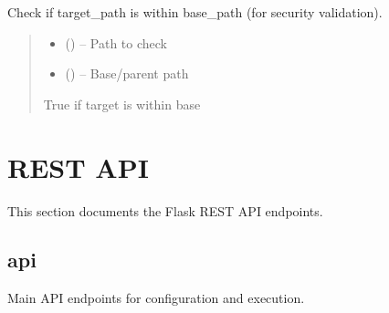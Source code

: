 \documentclass[a4paper,11pt,english,openany,oneside]{sphinxmanual}
\begin{document}
\begin{fulllineitems}
\label{\detokenize{modules/core:core.path_utils.is_path_within}}
\pysigstartsignatures
\pysiglinewithargsret
{}
{\sphinxparamcomma {}}
{}
\pysigstopsignatures
\sphinxAtStartPar
Check if target\_path is within base\_path (for security validation).
\begin{quote}\begin{description}
\begin{itemize}
\item {} 
\sphinxAtStartPar
{} () – Path to check

\item {} 
\sphinxAtStartPar
{} () – Base/parent path

\end{itemize}

\sphinxAtStartPar
True if target is within base

\sphinxAtStartPar
{}

\end{description}\end{quote}

\end{fulllineitems}


\sphinxstepscope


\chapter{REST API}
\label{\detokenize{modules/api:rest-api-reference}}\label{\detokenize{modules/api::doc}}
\sphinxAtStartPar
This section documents the Flask REST API endpoints.


\section{api}
\label{\detokenize{modules/api:api}}
\sphinxAtStartPar
Main API endpoints for configuration and execution.
\end{document}
